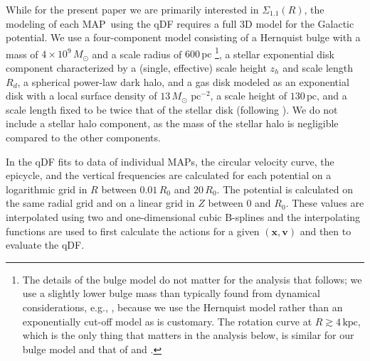 \documentclass{emulateapj}
\newcommand{\eg}{e.g.}
\renewcommand{\vec}[1]{\ensuremath{\mathbf{#1}}}
\newcommand{\vecx}{\ensuremath{\vec{x}}}
\newcommand{\vecv}{\ensuremath{\vec{v}}}
\newcommand{\map}{MAP}
\newcommand{\kpc}{\ensuremath{\,\mathrm{kpc}}}
\newcommand{\pc}{\ensuremath{\,\mathrm{pc}}}
\newcommand{\sigoneone}{\ensuremath{\Sigma_{1.1}}}
\begin{document}
While for the present paper we are primarily interested in
$\sigoneone(R)$, the modeling of each \map\ using the qDF requires a
full 3D model for the Galactic potential. We use a four-component
model consisting of a Hernquist bulge with a mass of
$4\times10^9\,M_\odot$ and a scale radius of $600\pc$
\footnote{The details of the bulge model do not matter for the
  analysis that follows; we use a slightly lower bulge mass than
  typically found from dynamical considerations, \eg,
  \citet{McMillan11a}, because we use the Hernquist model rather than
  an exponentially cut-off model as is customary. The rotation curve
  at $R \gtrsim 4\kpc$, which is the only thing that matters in the
  analysis below, is similar for our bulge model and that of
  \citet{binneytremaine} and \citet{McMillan11a}.}, a stellar
exponential disk component characterized by a (single, effective)
scale height $z_h$ and scale length $R_d$, a spherical power-law dark
halo, and a gas disk modeled as an exponential disk with a local
surface density of $13\,M_\odot\,\pc^{-2}$, a scale height of
$130\pc$, and a scale length fixed to be twice that of the stellar
disk (following \citealt{binneytremaine}). We do not include a stellar
halo component, as the mass of the stellar halo is negligible compared
to the other components.

In the qDF fits to data of individual \map s, the circular velocity
curve, the epicycle, and the vertical frequencies are calculated for
each potential on a logarithmic grid in $R$ between $0.01\,R_0$ and
$20\,R_0$. The potential is calculated on the same radial grid and on
a linear grid in $Z$ between $0$ and $R_0$. These values are
interpolated using two and one-dimensional cubic B-splines and the
interpolating functions are used to first calculate the actions for a
given $(\vecx,\vecv)$ and then to evaluate the qDF.
\end{document}
